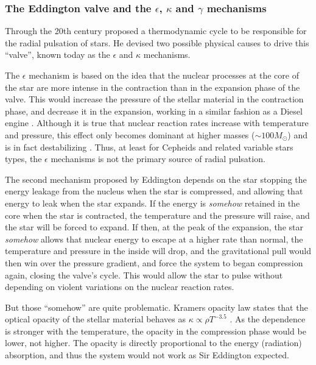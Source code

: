 	\subsubsection{The Eddington valve and the $\epsilon$, $\kappa$ and $\gamma$  mechanisms \label{sec:eddington}}
	
	Through the 20th century \cite{Eddington1918,Eddington1926,Eddington1941} 
	proposed a thermodynamic cycle to be responsible for the radial pulsation of stars. 
	He devised two possible physical causes to drive this \enquote{valve}, known today as the $\epsilon$ and $\kappa$ mechanisms.
	
	The $\epsilon$ mechanism is based on the idea that the nuclear processes at the core of the star 
	are more intense in the contraction than in the expansion phase of the valve.
	This would increase the pressure of the stellar material in the contraction phase, 
	and decrease it in the expansion, working in a similar fashion as a Diesel engine \citep{Zhevakin1963}.
	Although it is true that nuclear reaction rates increase with temperature and pressure, 
	this effect only becomes dominant at higher masses ($\sim 100 M_\odot$) and is in fact destabilizing \citep{Carroll2017,Zhevakin1963,Catelan2015}.
	Thus, at least for Cepheids and related variable stars types, the $\epsilon$ mechanisms is not the primary source of radial pulsation.
	
	The second mechanism proposed by Eddington depends on the star stopping 
	the energy leakage from the nucleus when the star is compressed, and allowing that energy to leak when the star expands.
	If the energy is \textit{somehow} retained in the core when the star is contracted,
	the temperature and the pressure will raise, and the star will be forced to expand.
	If then, at the peak of the expansion, the star \textit{somehow} allows that nuclear energy to escape at a higher rate than normal,
	the temperature and pressure in the inside will drop, 
	and the gravitational pull would then win over the pressure gradient, 
	and force the system to began compression again, closing the valve's cycle.
	This would allow the star to pulse without depending on violent variations on the nuclear reaction rates.
	
	But those \enquote{somehow} are quite problematic. Kramers opacity law states that 
	the optical opacity of the stellar material behaves as $\kappa \propto \rho T^{-3.5}$ \citep{Carroll2017}.
	As the dependence is stronger with the temperature, the opacity in the compression phase would be lower, not higher.
	The opacity is directly proportional to the energy (radiation) absorption, and thus the system would not work as Sir Eddington expected.
	
